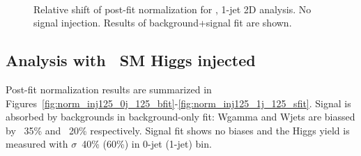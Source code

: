 \begin{figure}[!hbtp]
{}
\\
\caption{Relative shift of post-fit normalization for  \GeV, 1-jet 2D analysis.
No signal injection. Results of background+signal fit are shown.}
\label{fig:norm_injdef_1j_125_sfit}
\end{figure}

\clearpage

\subsection{Analysis with  \GeV\ SM Higgs injected}

Post-fit normalization results are summarized in Figures~\ref{fig:norm_inj125_0j_125_bfit}-\ref{fig:norm_inj125_1j_125_sfit}.
Signal is absorbed by backgrounds in background-only fit: Wgamma and Wjets are biassed by ~35\% and ~20\% respectively.
Signal fit shows no biases and the Higgs yield is measured with $\sigma$~40\% (60\%) in 0-jet (1-jet) bin.

